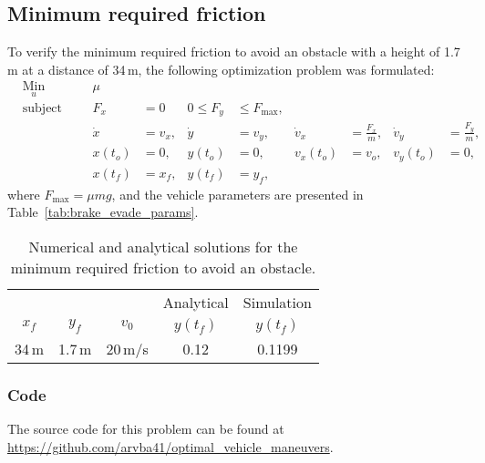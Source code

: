 \subsection{Minimum required friction}
To verify the minimum required friction to avoid an obstacle with a height of 1.7\,m at a distance of 34\,m, the following optimization problem was formulated:
\begin{align}
    & \underset{u}{\text{Min}}
    & & & \mu\\
%
    & \text{subject to} 
    & & & F_x &= 0 &0 \leq F_y &\leq F_{\text{max}},\\
%
    &&& & \dot x &= v_x, & \dot y &= v_y, & \dot v_x &= \frac{F_x}{m}, & \dot v_y &= \frac{F_y}{m},\\
%
    &&& & x(t_o) &= 0, & y(t_o) &= 0, & v_x(t_o) &= v_o, & v_y(t_o) &= 0,\\
    &&& & x(t_f) &= x_f, & y(t_f) &= y_f,
\end{align}
where $F_{\text{max}} = \mu m g$, and the vehicle parameters are presented in Table~\ref{tab:brake_evade_params}.
\begin{table}[h!]
    \centering
    \begin{tabular}{c|c|c|c|c}
        & & & Analytical & Simulation\\
        $x_f$ & $y_f$ & $v_0$ & $y(t_f)$ & $y(t_f)$ \\
        \hline
        34\,m & 1.7\,m & 20\,m/s & 0.12 & 0.1199 \\
    \end{tabular}
    \caption{Numerical and analytical solutions for the minimum required friction to avoid an obstacle.}
\end{table}
\subsubsection{Code}
The source code for this problem can be found at \newline \href{https://github.com/arvba41/optimal_vehicle_maneuvers/blob/main/uppgift/ugf3/brake_or_evade_p2b.m}{https://github.com/arvba41/optimal\_vehicle\_maneuvers}.
